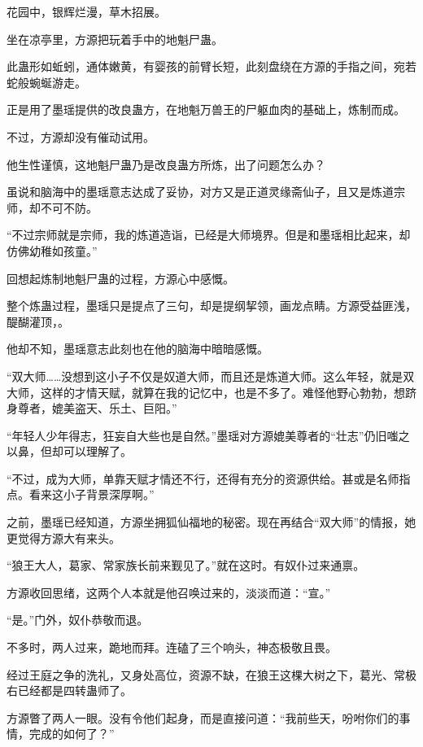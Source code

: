 
\begin{this_body}

花园中，银辉烂漫，草木招展。

坐在凉亭里，方源把玩着手中的地魁尸蛊。

此蛊形如蚯蚓，通体嫩黄，有婴孩的前臂长短，此刻盘绕在方源的手指之间，宛若蛇般蜿蜒游走。

正是用了墨瑶提供的改良蛊方，在地魁万兽王的尸躯血肉的基础上，炼制而成。

不过，方源却没有催动试用。

他生性谨慎，这地魁尸蛊乃是改良蛊方所炼，出了问题怎么办？

虽说和脑海中的墨瑶意志达成了妥协，对方又是正道灵缘斋仙子，且又是炼道宗师，却不可不防。

“不过宗师就是宗师，我的炼道造诣，已经是大师境界。但是和墨瑶相比起来，却仿佛幼稚如孩童。”

回想起炼制地魁尸蛊的过程，方源心中感慨。

整个炼蛊过程，墨瑶只是提点了三句，却是提纲挈领，画龙点睛。方源受益匪浅，醍醐灌顶，。

他却不知，墨瑶意志此刻也在他的脑海中暗暗感慨。

“双大师……没想到这小子不仅是奴道大师，而且还是炼道大师。这么年轻，就是双大师，这样的才情天赋，就算在我的记忆中，也是不多了。难怪他野心勃勃，想跻身尊者，媲美盗天、乐土、巨阳。”

“年轻人少年得志，狂妄自大些也是自然。”墨瑶对方源媲美尊者的“壮志”仍旧嗤之以鼻，但却可以理解了。

“不过，成为大师，单靠天赋才情还不行，还得有充分的资源供给。甚或是名师指点。看来这小子背景深厚啊。”

之前，墨瑶已经知道，方源坐拥狐仙福地的秘密。现在再结合“双大师”的情报，她更觉得方源大有来头。

“狼王大人，葛家、常家族长前来觐见了。”就在这时。有奴仆过来通禀。

方源收回思绪，这两个人本就是他召唤过来的，淡淡而道：“宣。”

“是。”门外，奴仆恭敬而退。

不多时，两人过来，跪地而拜。连磕了三个响头，神态极敬且畏。

经过王庭之争的洗礼，又身处高位，资源不缺，在狼王这棵大树之下，葛光、常极右已经都是四转蛊师了。

方源瞥了两人一眼。没有令他们起身，而是直接问道：“我前些天，吩咐你们的事情，完成的如何了？”


\end{this_body}
